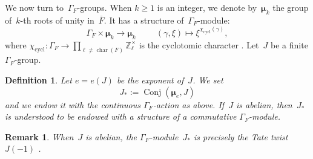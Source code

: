 \documentclass[a4paper,english,12pt]{amsart}
\newcommand{\ZZ}{\mathbb{Z}}
\newcommand{\muu}{\boldsymbol{\mu}}
\DeclareMathOperator{\Conj}{Conj}
\DeclareMathOperator{\cycl}{cycl}
\DeclareMathOperator{\charr}{char}
\newtheorem{mydef}[equation]{Definition}
\newtheorem{rem}[equation]{Remark}
\numberwithin{equation}{subsection}
\begin{document}
\subsubsection{}We now turn to~$\Gamma_F$-groups. %
When $k\geq 1$ is an integer, we denote by~$\muu_k$ the group of~$k$-th roots of unity in~$\overline{F}$. It has a structure of~$\Gamma_F$-module: $$\Gamma_F\times\muu_k\to\muu_k\hspace{1cm}(\gamma,\xi)\mapsto \xi^{\chi_{\cycl}(\gamma)},$$where $\chi_{\cycl}:\Gamma_F\to\prod_{\ell\neq \charr(F)}\ZZ_{\ell}^{\times}$ is the cyclotomic character \cite[Definition 7.3.6]{CohomologyNF}. Let~$J$ be a finite $\Gamma_F$-group.
\begin{mydef}
Let $e=e(J)$ be the exponent of~$J$. %
We set $$J_*:=\Conj(\muu_{e},J)$$ and we endow it with the continuous $\Gamma_F$-action as above. If~$J$ is abelian, then~$J_*$ is understood to be endowed with a structure of a commutative $\Gamma_F$-module.
\end{mydef}
\begin{rem}
\normalfont
When~$J$ is abelian, the $\Gamma_F$-module~$J_*$ is precisely the Tate twist $J(-1)$ \cite[Section 7.8]{cohomologicalinvariants}.
\end{rem}
\end{document}
